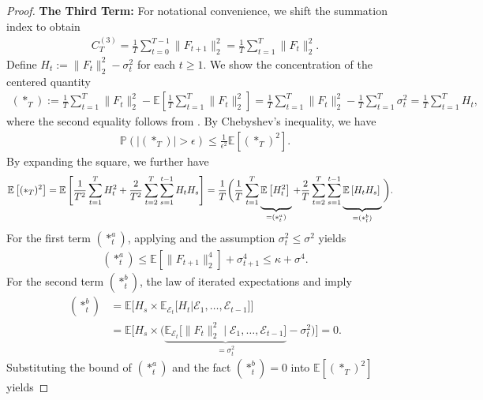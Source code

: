 \documentclass[a4paper, 11pt]{article}
\newcommand{\E}{\mathbb E}
\newcommand{\T}{\mathcal E}
\theoremstyle{definition}
\begin{document}
\begin{proof}
    \vspace{5pt}
    \noindent
    \textbf{The Third Term:} 
    For notational convenience, we shift the summation index to obtain
    \begin{align}
		C_T^{(3)} = \frac{1}{T} \sum_{t=0}^{T-1} \|F_{t+1}\|^2_2 = \frac{1}{T} \sum_{t=1}^{T} \|F_{t}\|^2_2 .
	\end{align}
    Define $H_{t} := \| F_{t} \|_2^2 - \sigma_{t}^2$ for each $t \ge 1$.
    We show the concentration of the centered quantity
	\begin{align}
		(*_T) := \frac{1}{T} \sum_{t=1}^{T} \| F_{t} \|_2^2 - \E\left[ \frac{1}{T} \sum_{t=1}^{T} \| F_{t} \|_2^2  \right] = \frac{1}{T} \sum_{t=1}^{T} \| F_{t} \|_2^2 - \frac{1}{T} \sum_{t=1}^{T} \sigma_{t}^2 = \frac{1}{T} \sum_{t=1}^{T} H_{t} ,
	\end{align}
    where the second equality follows from .
	By Chebyshev's inequality, we have
	\begin{align}
		\mathbb{P}\left( \left| (*_T) \right| > \epsilon \right) \le \frac{1}{\epsilon^2} \E\left[ (*_T)^2 \right] .
	\end{align}
	By expanding the square, we further have
	\begin{align}
		\E\left[ (*_T)^2 \right] & = \E\left[ \frac{1}{T^2} \sum_{t=1}^{T} H_{t}^2 + \frac{2}{T^2} \sum_{t=2}^{T} \sum_{s=1}^{t-1} H_{t} H_{s} \right] = \frac{1}{T} \bigg( \frac{1}{T} \sum_{t=1}^{T} \underbrace{ \E\left[ H_{t}^2 \right] \vphantom{\sum_{t=1}^{T} } }_{ = (*_t^a) } + \frac{2}{T} \sum_{t=2}^{T} \sum_{s=1}^{t-1} \underbrace{ \E\left[ H_{t} H_{s} \right] \vphantom{\sum_{t=1}^{T} } }_{ = (*_t^b) } \bigg) .
	\end{align}
	For the first term $(*_t^a)$, applying  and the assumption $\sigma_t^2 \le \sigma^2$ yields
	\begin{align}
		(*_t^a) \le \E\left[ \| F_{t+1} \|_2^4 \right] + \sigma_{t+1}^4 \le \kappa + \sigma^4 .
	\end{align}
	For the second term $(*_t^b)$, the law of iterated expectations and  imply
	\begin{align}
		(*_t^b) & = \E\Big[ H_{s} \times \E_{\T_{t}}\big[ H_{t} | \T_1, \dots, \T_{t-1} \big] \Big] \\
		& = \E\Big[ H_{s} \times \Big( \underbrace{ \E_{\T_{t}}\big[ \| F_{t} \|_2^2 \mid \T_1, \dots, \T_{t-1} \big] }_{ = \sigma_{t}^2} - \sigma_{t}^2 \Big) \Big] = 0 .
	\end{align}
	Substituting the bound of $(*_t^a)$ and the fact $(*_t^b) = 0$ into $\E[ (*_T)^2 ]$ yields

\end{proof}
\end{document}
